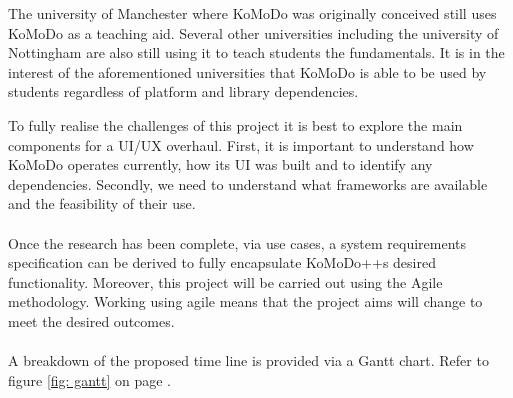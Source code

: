 The university of Manchester where KoMoDo was originally conceived still uses KoMoDo as a teaching aid. Several other universities including the university of Nottingham are also still using it to teach students the fundamentals. It is in the interest of the aforementioned universities that KoMoDo is able to be used by students regardless of platform and library dependencies.

To fully realise the challenges of this project it is best to explore the main components for a UI/UX overhaul. First, it is important to understand how KoMoDo operates currently, how its UI was built and to identify any dependencies. Secondly, we need to understand what frameworks are available and the feasibility of their use. \\\\
%
Once the research has been complete, via use cases, a system requirements specification can be derived to fully encapsulate KoMoDo++s desired functionality. Moreover, this project will be carried out using the Agile methodology. Working using agile means that the project aims will change to meet the desired outcomes.\\\\
%
A breakdown of the proposed time line is provided via a Gantt chart. Refer to figure \ref{fig: gantt} on page \pageref{fig: gantt}.
